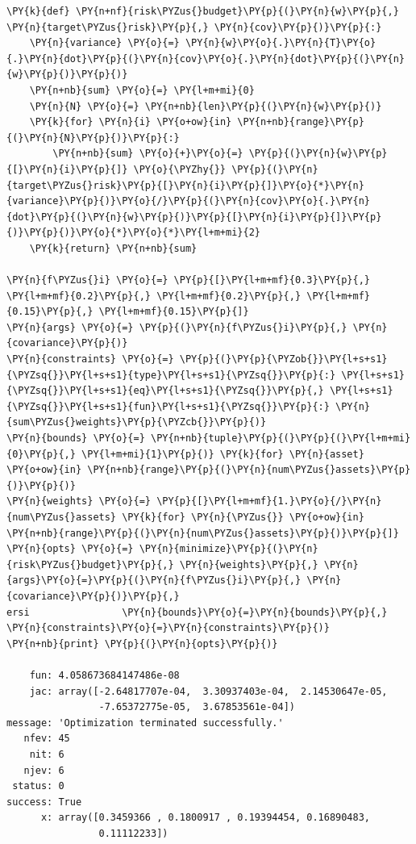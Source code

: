 \begin{codebox}
\begin{Verbatim}[commandchars=\\\{\}]
\PY{k}{def} \PY{n+nf}{risk\PYZus{}budget}\PY{p}{(}\PY{n}{w}\PY{p}{,} \PY{n}{target\PYZus{}risk}\PY{p}{,} \PY{n}{cov}\PY{p}{)}\PY{p}{:}
    \PY{n}{variance} \PY{o}{=} \PY{n}{w}\PY{o}{.}\PY{n}{T}\PY{o}{.}\PY{n}{dot}\PY{p}{(}\PY{n}{cov}\PY{o}{.}\PY{n}{dot}\PY{p}{(}\PY{n}{w}\PY{p}{)}\PY{p}{)} 
    \PY{n+nb}{sum} \PY{o}{=} \PY{l+m+mi}{0}
    \PY{n}{N} \PY{o}{=} \PY{n+nb}{len}\PY{p}{(}\PY{n}{w}\PY{p}{)}
    \PY{k}{for} \PY{n}{i} \PY{o+ow}{in} \PY{n+nb}{range}\PY{p}{(}\PY{n}{N}\PY{p}{)}\PY{p}{:}
        \PY{n+nb}{sum} \PY{o}{+}\PY{o}{=} \PY{p}{(}\PY{n}{w}\PY{p}{[}\PY{n}{i}\PY{p}{]} \PY{o}{\PYZhy{}} \PY{p}{(}\PY{n}{target\PYZus{}risk}\PY{p}{[}\PY{n}{i}\PY{p}{]}\PY{o}{*}\PY{n}{variance}\PY{p}{)}\PY{o}{/}\PY{p}{(}\PY{n}{cov}\PY{o}{.}\PY{n}{dot}\PY{p}{(}\PY{n}{w}\PY{p}{)}\PY{p}{[}\PY{n}{i}\PY{p}{]}\PY{p}{)}\PY{p}{)}\PY{o}{*}\PY{o}{*}\PY{l+m+mi}{2} 
    \PY{k}{return} \PY{n+nb}{sum}
		
\PY{n}{f\PYZus{}i} \PY{o}{=} \PY{p}{[}\PY{l+m+mf}{0.3}\PY{p}{,} \PY{l+m+mf}{0.2}\PY{p}{,} \PY{l+m+mf}{0.2}\PY{p}{,} \PY{l+m+mf}{0.15}\PY{p}{,} \PY{l+m+mf}{0.15}\PY{p}{]} 
\PY{n}{args} \PY{o}{=} \PY{p}{(}\PY{n}{f\PYZus{}i}\PY{p}{,} \PY{n}{covariance}\PY{p}{)}
\PY{n}{constraints} \PY{o}{=} \PY{p}{(}\PY{p}{\PYZob{}}\PY{l+s+s1}{\PYZsq{}}\PY{l+s+s1}{type}\PY{l+s+s1}{\PYZsq{}}\PY{p}{:} \PY{l+s+s1}{\PYZsq{}}\PY{l+s+s1}{eq}\PY{l+s+s1}{\PYZsq{}}\PY{p}{,} \PY{l+s+s1}{\PYZsq{}}\PY{l+s+s1}{fun}\PY{l+s+s1}{\PYZsq{}}\PY{p}{:} \PY{n}{sum\PYZus{}weights}\PY{p}{\PYZcb{}}\PY{p}{)}          
\PY{n}{bounds} \PY{o}{=} \PY{n+nb}{tuple}\PY{p}{(}\PY{p}{(}\PY{l+m+mi}{0}\PY{p}{,} \PY{l+m+mi}{1}\PY{p}{)} \PY{k}{for} \PY{n}{asset} \PY{o+ow}{in} \PY{n+nb}{range}\PY{p}{(}\PY{n}{num\PYZus{}assets}\PY{p}{)}\PY{p}{)}
\PY{n}{weights} \PY{o}{=} \PY{p}{[}\PY{l+m+mf}{1.}\PY{o}{/}\PY{n}{num\PYZus{}assets} \PY{k}{for} \PY{n}{\PYZus{}} \PY{o+ow}{in} \PY{n+nb}{range}\PY{p}{(}\PY{n}{num\PYZus{}assets}\PY{p}{)}\PY{p}{]}
\PY{n}{opts} \PY{o}{=} \PY{n}{minimize}\PY{p}{(}\PY{n}{risk\PYZus{}budget}\PY{p}{,} \PY{n}{weights}\PY{p}{,} \PY{n}{args}\PY{o}{=}\PY{p}{(}\PY{n}{f\PYZus{}i}\PY{p}{,} \PY{n}{covariance}\PY{p}{)}\PY{p}{,} 
ersi                \PY{n}{bounds}\PY{o}{=}\PY{n}{bounds}\PY{p}{,} \PY{n}{constraints}\PY{o}{=}\PY{n}{constraints}\PY{p}{)}
\PY{n+nb}{print} \PY{p}{(}\PY{n}{opts}\PY{p}{)}
		
    fun: 4.058673684147486e-08
    jac: array([-2.64817707e-04,  3.30937403e-04,  2.14530647e-05, 
                -7.65372775e-05,  3.67853561e-04])
message: 'Optimization terminated successfully.'
   nfev: 45
    nit: 6
   njev: 6
 status: 0
success: True
      x: array([0.3459366 , 0.1800917 , 0.19394454, 0.16890483, 
                0.11112233])
      

\end{Verbatim}
\end{codebox}

